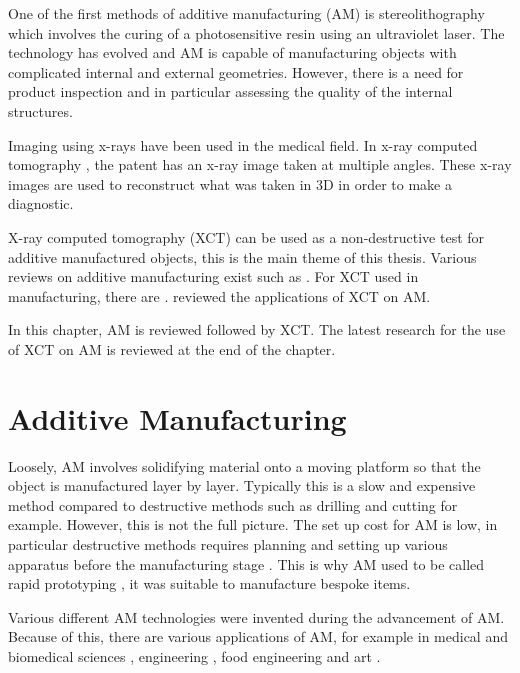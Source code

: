 One of the first methods of additive manufacturing (AM) is stereolithography \citep{kodama1981automatic, hull1986apparatus, 3d2019our} which involves the curing of a photosensitive resin using an ultraviolet laser. The technology has evolved and AM is capable of manufacturing objects with complicated internal and external geometries. However, there is a need for product inspection and in particular assessing the quality of the internal structures.

Imaging using x-rays \citep{rontgen1896on} have been used in the medical field. In x-ray computed tomography \citep{cormack1973reconstruction, hounsfield1973computerized, hounsfield1980computed}, the patent has an x-ray image taken at multiple angles. These x-ray images are used to reconstruct what was taken in 3D in order to make a diagnostic.

X-ray computed tomography (XCT) can be used as a non-destructive test for additive manufactured objects, this is the main theme of this thesis. Various reviews on additive manufacturing exist such as \cite{kruth1991material, kruth1998progress, pham1998comparison, gibson2010additive, wong2012review, ngo2018additive}. For XCT used in manufacturing, there are \cite{cantatore2011introduction, kruth2011computed, sun2012overview}. \cite{thompson2016x} reviewed the applications of XCT on AM.

In this chapter, AM is reviewed followed by XCT. The latest research for the use of XCT on AM is reviewed at the end of the chapter.

\section{Additive Manufacturing}

Loosely, AM involves solidifying material onto a moving platform so that the object is manufactured layer by layer. Typically this is a slow and expensive method compared to destructive methods such as drilling and cutting for example. However, this is not the full picture. The set up cost for AM is low, in particular destructive methods requires planning and setting up various apparatus before the manufacturing stage \citep{gibson2010additive}. This is why AM used to be called rapid prototyping \citep{kruth1991material}, it was suitable to manufacture bespoke items.

Various different AM technologies were invented during the advancement of AM. Because of this, there are various applications of AM, for example in medical and biomedical sciences \citep{kang20163d, kourra2018computed}, engineering \citep{cooper2015design}, food engineering \citep{godoi20163d} and art \citep{ornes2013mathematics, grossman2019bathsheba}.

